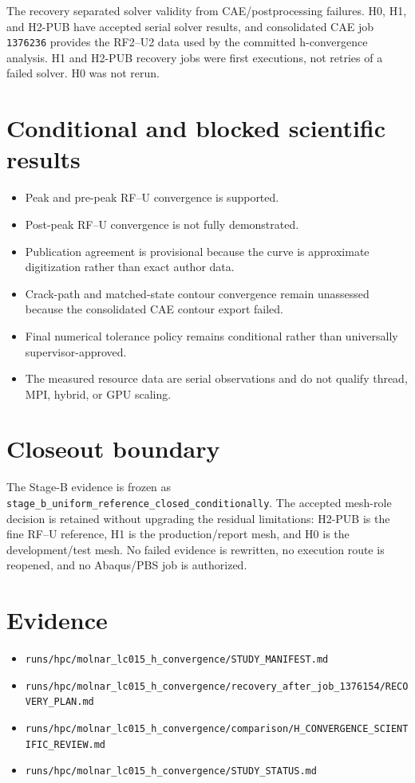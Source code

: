 \documentclass[11pt,a4paper]{article}
\begin{document}
The recovery separated solver validity from CAE/postprocessing failures.  H0,
H1, and H2-PUB have accepted serial solver results, and consolidated CAE job
\texttt{1376236} provides the RF2--U2 data used by the committed
h-convergence analysis.  H1 and H2-PUB recovery jobs were first executions,
not retries of a failed solver.  H0 was not rerun.

\section{Conditional and blocked scientific results}

\begin{itemize}
\item Peak and pre-peak RF--U convergence is supported.
\item Post-peak RF--U convergence is not fully demonstrated.
\item Publication agreement is provisional because the curve is approximate
digitization rather than exact author data.
\item Crack-path and matched-state contour convergence remain unassessed
because the consolidated CAE contour export failed.
\item Final numerical tolerance policy remains conditional rather than
universally supervisor-approved.
\item The measured resource data are serial observations and do not qualify
thread, MPI, hybrid, or GPU scaling.
\end{itemize}

\section{Closeout boundary}

The Stage-B evidence is frozen as
\texttt{stage\_b\_uniform\_reference\_closed\_conditionally}.  The accepted
mesh-role decision is retained without upgrading the residual limitations:
H2-PUB is the fine RF--U reference, H1 is the production/report mesh, and H0
is the development/test mesh.  No failed evidence is rewritten, no execution
route is reopened, and no Abaqus/PBS job is authorized.

\section*{Evidence}

\begin{itemize}
\item \texttt{runs/hpc/molnar\_lc015\_h\_convergence/STUDY\_MANIFEST.md}
\item \texttt{runs/hpc/molnar\_lc015\_h\_convergence/recovery\_after\_job\_1376154/RECOVERY\_PLAN.md}
\item \texttt{runs/hpc/molnar\_lc015\_h\_convergence/comparison/H\_CONVERGENCE\_SCIENTIFIC\_REVIEW.md}
\item \texttt{runs/hpc/molnar\_lc015\_h\_convergence/STUDY\_STATUS.md}
\end{itemize}
\end{document}
